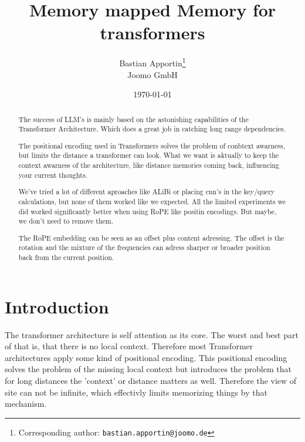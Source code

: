 \documentclass[11pt]{article}
\title{Memory mapped Memory for transformers}
\author{
  Bastian Apportin\thanks{Corresponding author: \texttt{bastian.apportin@joomo.de}} \\
  \normalsize Joomo GmbH \\
}
\date{\today}
\begin{document}
\maketitle

\begin{abstract}
The success of LLM's is mainly based on the astonishing capabilities of the Transformer Architecture. 
Which does a great job in catching long range dependencies.

The positional encoding used in Transformers solves the problem of conbtext awarness, but limits the distance a transformer can look. What we want is aktually 
to keep the context awarness of the architecture, like distance memories coming back, influencing your current thoughts.

We've tried a lot of different aproaches like ALiBi or placing cnn's in the key/query calculations, but none of them worked like we expected. All the limited
experiments we did worked significantly better when using RoPE like positin encodings. But maybe, we don't need to remove them.

The RoPE embedding can be seen as an offset plus content adressing. The offset is the rotation and the mixture of the frequencies can adress sharper or broader position
back from the current position. 



\end{abstract}


\section{Introduction}

The transformer architecture is self attention as its core. The worst and best part of that is, that there is no local context. Therefore 
most Transformer architectures apply some kind of positional encoding. This positional encoding solves the problem of the missing local context
but introduces the problem that for long distances the 'context' or distance matters as well. Therefore the view of site can not be infinite, which 
effectivly limits memorizing things by that mechanism.
\end{document}

